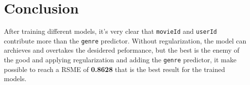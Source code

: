\documentclass[
]{article}
\begin{document}
\hypertarget{conclusion}{%
\section{Conclusion}\label{conclusion}}

After training different models, it's very clear that \texttt{movieId}
and \texttt{userId} contribute more than the \texttt{genre} predictor.
Without regularization, the model can archieves and overtakes the
desidered peformance, but the best is the enemy of the good and applying
regularization and adding the \texttt{genre} predictor, it make possible
to reach a RSME of \textbf{0.8628} that is the best result for the
trained models.
\end{document}
